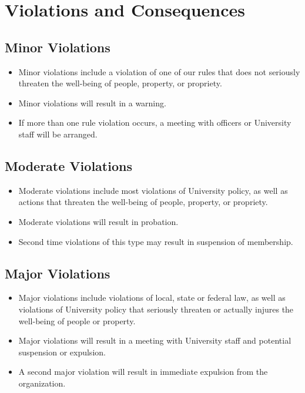 \section{Violations and Consequences}
\subsection{Minor Violations}
\begin{itemize}
	\item Minor violations include a violation of one of our rules that does not seriously threaten the well-being of people, property, or propriety.
	\item Minor violations will result in a warning.
	\item If more than one rule violation occurs, a meeting with officers or University staff will be arranged.
\end{itemize}

\subsection{Moderate Violations}
\begin{itemize}
	\item Moderate violations include most violations of University policy, as well as actions that threaten the well-being of people, property, or propriety.
	\item Moderate violations will result in probation.
	\item Second time violations of this type may result in suspension of membership.
\end{itemize}

\subsection{Major Violations}
\begin{itemize}
	\item Major violations include violations of local, state or federal law, as well as violations of University policy that seriously threaten or actually injures the well-being of people or property.
	\item Major violations will result in a meeting with University staff and potential suspension or expulsion.
	\item A second major violation will result in immediate expulsion from the organization.
\end{itemize}


